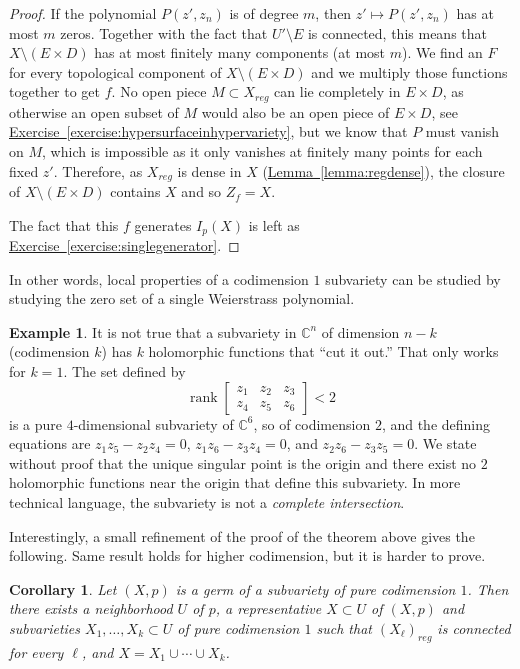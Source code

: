 \documentclass[12pt,openany]{book}
\newcommand{\C}{{\mathbb{C}}}
\newcommand{\rank}{\operatorname{rank}}
\newcommand{\myindex}[1]{#1\index{#1}}
\theoremstyle{plain}
\newtheorem{cor}[thm]{Corollary}
\theoremstyle{remark}
\theoremstyle{definition}
\theoremstyle{exercise}
\theoremstyle{example}
\newtheorem{example}[thm]{Example}
\newcommand{\exerciseref}[1]{\hyperref[#1]{Exercise~\ref*{#1}}}
\newcommand{\lemmaref}[1]{\hyperref[#1]{Lemma~\ref*{#1}}}
\begin{document}
\begin{proof}
If the polynomial $P(z',z_n)$ is of degree $m$,
then $z' \mapsto P(z',z_n)$ has at most $m$ zeros.  Together with
the fact that $U' \setminus E$ is connected, this means that
$X \setminus (E \times D)$ has at most finitely many components (at
most $m$).
We find an $F$ for every topological component of $X \setminus ( E \times D )$
and we multiply those functions together to get $f$.
No open piece $M \subset X_{\mathit{reg}}$ can lie completely in $E \times D$,
as otherwise an open subset of $M$ would also be an open piece of $E \times D$,
see \exerciseref{exercise:hypersurfaceinhypervariety},
but we know that $P$ must vanish on $M$, which is impossible as
it only vanishes at finitely
many points for each fixed $z'$.
Therefore, as $X_{\mathit{reg}}$ is dense in $X$ (\lemmaref{lemma:regdense}),
the closure of $X \setminus (E \times D)$ contains $X$ and so $Z_f = X$.

The fact that this $f$ generates $I_p(X)$ is left as
\exerciseref{exercise:singlegenerator}.
\end{proof}

In other words, local properties of a codimension $1$ subvariety can be
studied by studying the zero set of a single Weierstrass polynomial.

\begin{example}
It is not true that
a subvariety in $\C^n$ of dimension $n-k$ (codimension $k$)
has $k$
holomorphic functions that ``cut it out.''  That only works for $k=1$.
The set defined by
\begin{equation*}
\rank
\begin{bmatrix}
z_1 & z_2 & z_3 \\
z_4 & z_5 & z_6
\end{bmatrix}
< 2
\end{equation*}
is a pure $4$-dimensional subvariety of $\C^6$, so of codimension $2$,
and the defining equations are
$z_1z_5-z_2z_4 = 0$,
$z_1z_6-z_3z_4 = 0$, and
$z_2z_6-z_3z_5 = 0$.  We state without proof that the unique singular point is the origin and there exist
no $2$ holomorphic functions near the origin
that define this subvariety.  In more technical
language, the subvariety is not a \emph{\myindex{complete intersection}}.
\end{example}

Interestingly, a small refinement of the proof of the theorem above gives
the following.
Same result holds
for higher codimension, but it is harder to prove.

\begin{cor}
Let $(X,p)$ is a germ of a subvariety of pure codimension $1$.  Then there exists
a neighborhood $U$ of $p$, a representative $X \subset U$ of $(X,p)$
and subvarieties $X_1,\ldots,X_k \subset U$
of pure codimension $1$ such that $(X_\ell)_{\mathit{reg}}$ is connected for
every $\ell$, and
$X = X_1 \cup \cdots \cup X_k$.
\end{cor}
\end{document}

